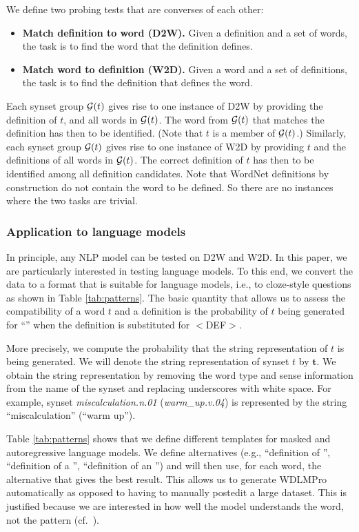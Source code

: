 \documentclass[11pt,a4paper]{article}
\begin{document}
We define two probing tests that are converses of each other:
\begin{itemize}
  \item \textbf{Match definition to word (D2W).} Given a
    definition and a set of words, the task is to find the
    word that the definition defines.
  \item \textbf{Match word to definition (W2D).} Given a
    word and a set of definitions, the task is to find the
    definition that defines the word.
    \end{itemize}
Each synset group ${\cal G}(t)$ gives rise to one instance
of D2W by providing the definition of $t$, and all words in
${\cal G}(t)$. The word from ${\cal G}(t)$ that matches the
definition has then to be identified. (Note that $t$ is a
member of ${\cal G}(t)$.)
Similarly, each synset group ${\cal G}(t)$ gives rise to one instance
of W2D by providing $t$ and the definitions of all words in
${\cal G}(t)$. The
correct definition  of $t$ has then to be identified among
all definition  candidates. Note that WordNet definitions by
construction do not contain the word to be defined. So there
are no instances where the two tasks are trivial.

\subsubsection{Application to language models}
In principle, any NLP model can be tested on D2W and W2D.
In this paper, we are particularly
interested in testing language models. To this end, we 
convert the data to a format that is suitable for language
models, i.e., to cloze-style questions as
shown in Table
\ref{tab:patterns}. The basic quantity that allows us to
assess the compatibility of a word $t$ and a definition is the
probability of
$t$ being generated for 
``\underline{\hspace{3mm}}'' when the definition is substituted for $<$DEF$>$.

More precisely, we compute the probability that the string
representation of $t$ is being generated.
We will denote the string representation of synset $t$ by
$\bm{t}$. 
We obtain the string representation by removing
the word type and sense information from the name of the
synset and replacing underscores with white space. For
example, synset \emph{miscalculation.n.01}
(\emph{warm\_up.v.04})
is represented by
the string ``miscalculation'' (``warm
up'').

Table
\ref{tab:patterns}
shows
that we define different templates for masked
and autoregressive language models. We define alternatives
(e.g., ``definition of \underline{\hspace{3mm}}'', 
``definition of a \underline{\hspace{3mm}}'', 
``definition of an \underline{\hspace{3mm}}'') and will then
use, for each word, the alternative that gives the best
result. This allows us to generate  WDLMPro automatically as
opposed to having to manually postedit a large dataset.
This is justified because we are interested in
how well the model understands the word, not the pattern (cf.\  ). 
\end{document}
